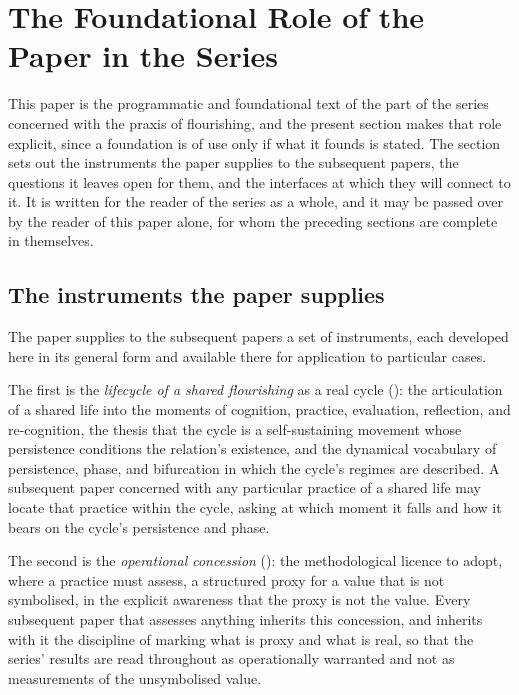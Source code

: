 \section{The Foundational Role of the Paper in the Series}
\label{p11:sec:foundational}

\noindent
This paper is the programmatic and foundational text of the part of the series concerned with the praxis of flourishing, and the present section makes that role explicit, since a foundation is of use only if what it founds is stated. The section sets out the instruments the paper supplies to the subsequent papers, the questions it leaves open for them, and the interfaces at which they will connect to it. It is written for the reader of the series as a whole, and it may be passed over by the reader of this paper alone, for whom the preceding sections are complete in themselves.

\subsection{The instruments the paper supplies}
\label{p11:sec:found-instruments}

The paper supplies to the subsequent papers a set of instruments, each developed here in its general form and available there for application to particular cases.

The first is the \emph{lifecycle of a shared flourishing} as a real cycle (): the articulation of a shared life into the moments of cognition, practice, evaluation, reflection, and re-cognition, the thesis that the cycle is a self-sustaining movement whose persistence conditions the relation's existence, and the dynamical vocabulary of persistence, phase, and bifurcation in which the cycle's regimes are described. A subsequent paper concerned with any particular practice of a shared life may locate that practice within the cycle, asking at which moment it falls and how it bears on the cycle's persistence and phase.

The second is the \emph{operational concession} (): the methodological licence to adopt, where a practice must assess, a structured proxy for a value that is not symbolised, in the explicit awareness that the proxy is not the value. Every subsequent paper that assesses anything inherits this concession, and inherits with it the discipline of marking what is proxy and what is real, so that the series' results are read throughout as operationally warranted and not as measurements of the unsymbolised value.

